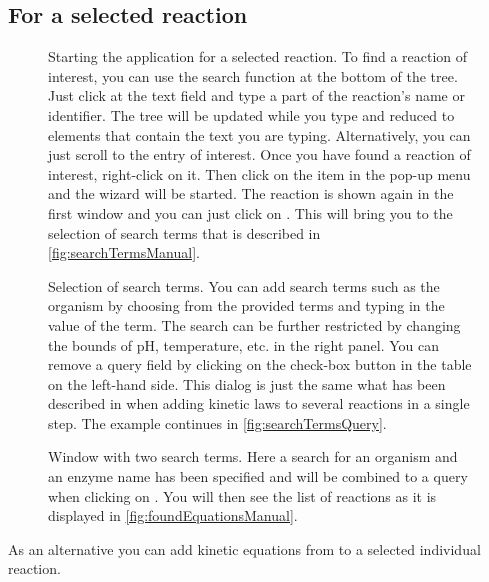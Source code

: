 \subsection{For a selected reaction}

\begin{figure}[t!]
\caption[Starting the \SABIO application for a selected reaction]{Starting the \SABIO application for a selected reaction.
To find a reaction of interest, you can use the search function at the bottom of the \SBML tree.
Just click at the text field and type a part of the reaction's name or identifier.
The tree will be updated while you type and reduced to elements that contain the text you are typing.
Alternatively, you can just scroll to the entry of interest.
Once you have found a reaction of interest, right-click on it.
Then click on the \SABIO item in the pop-up menu and the \SABIO wizard will be started.
The reaction is shown again in the first window and you can just click on .
This will bring you to the selection of search terms that is described in \vref{fig:searchTermsManual}.}
\label{fig:startManual}
\end{figure}
\begin{figure}[t!]
\caption[Selection of search terms]{Selection of search terms.
You can add search terms such as the organism by choosing from the provided terms and
typing in the value of the term. The search can be further restricted by changing the
bounds of pH, temperature, etc. in the right panel. 
You can remove a query field by clicking on the check-box button in the table on the left-hand side.
This dialog is just the same what has been described in  when adding kinetic laws to several reactions in a single step.
The example continues in \vref{fig:searchTermsQuery}.}
\label{fig:searchTermsManual}
\end{figure}
\begin{figure}[t!]
\caption[Window with two search terms]{Window with two search terms.
Here a search for an organism and an enzyme name has been specified and will be
combined to a query when clicking on .
You will then see the list of reactions as it is displayed in \vref{fig:foundEquationsManual}.
}
\label{fig:searchTermsQuery}
\end{figure}
As an alternative you can add kinetic equations from \SABIO to a selected individual reaction.
